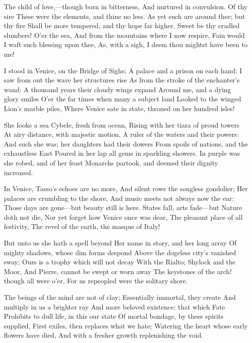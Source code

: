 \documentclass[10pt,twocolumn]{book}
\begin{document}
   The child of love,---though born in bitterness,
   And nurtured in convulsion.  Of thy sire
   These were the elements, and thine no less.
   As yet such are around thee; but thy fire
   Shall be more tempered, and thy hope far higher.
   Sweet be thy cradled slumbers!  O'er the sea,
   And from the mountains where I now respire,
   Fain would I waft such blessing upon thee,
As, with a sigh, I deem thou mightst have been to me!


\canto


   I stood in Venice, on the Bridge of Sighs;
   A palace and a prison on each hand:
   I saw from out the wave her structures rise
   As from the stroke of the enchanter's wand:
   A thousand years their cloudy wings expand
   Around me, and a dying glory smiles
   O'er the far times when many a subject land
   Looked to the winged Lion's marble piles,
Where Venice sate in state, throned on her hundred isles!


   She looks a sea Cybele, fresh from ocean,
   Rising with her tiara of proud towers
   At airy distance, with majestic motion,
   A ruler of the waters and their powers:
   And such she was; her daughters had their dowers
   From spoils of nations, and the exhaustless East
   Poured in her lap all gems in sparkling showers.
   In purple was she robed, and of her feast
Monarchs partook, and deemed their dignity increased.


   In Venice, Tasso's echoes are no more,
   And silent rows the songless gondolier;
   Her palaces are crumbling to the shore,
   And music meets not always now the ear:
   Those days are gone---but beauty still is here.
   States fall, arts fade---but Nature doth not die,
   Nor yet forget how Venice once was dear,
   The pleasant place of all festivity,
The revel of the earth, the masque of Italy!


   But unto us she hath a spell beyond
   Her name in story, and her long array
   Of mighty shadows, whose dim forms despond
   Above the dogeless city's vanished sway;
   Ours is a trophy which will not decay
   With the Rialto; Shylock and the Moor,
   And Pierre, cannot be swept or worn away\textemdash
   The keystones of the arch! though all were o'er,
For us repeopled were the solitary shore.


   The beings of the mind are not of clay;
   Essentially immortal, they create
   And multiply in us a brighter ray
   And more beloved existence:  that which Fate
   Prohibits to dull life, in this our state
   Of mortal bondage, by these spirits supplied,
   First exiles, then replaces what we hate;
   Watering the heart whose early flowers have died,
And with a fresher growth replenishing the void.
\end{document}
